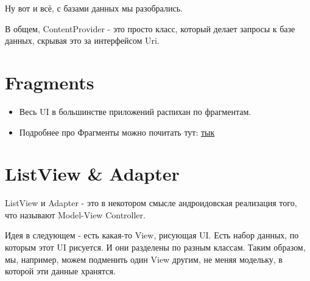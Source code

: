 \documentclass[12 pt]{article}
\begin{document}
    Ну вот и всё, с базами данных мы разобрались.
    
    В общем, ContentProvider - это просто класс, который делает запросы к базе данных, скрывая это за интерфейсом Uri.
    
\section{Fragments}
    \begin{itemize}
	\item Весь UI в большинстве приложений распихан по фрагментам.
	\item Подробнее про Фрагменты можно почитать тут: \href{http://developer.alexanderklimov.ru/android/theory/fragments.php}{тык}
    \end{itemize}
\section{ListView \& Adapter}   
    ListView и Adapter - это в некотором смысле андроидовская реализация того, что называют Model-View Controller.
    
    Идея в следующем - есть какая-то View, рисующая UI. Есть набор данных, по которым этот UI рисуется. И они разделены по разным классам. Таким образом, мы, например, можем подменить один View другим, не меняя модельку, в которой эти данные хранятся.
\end{document}
